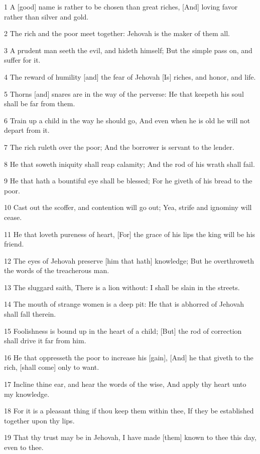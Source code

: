 \par 1 A [good] name is rather to be chosen than great riches, [And] loving favor rather than silver and gold.
\par 2 The rich and the poor meet together: Jehovah is the maker of them all.
\par 3 A prudent man seeth the evil, and hideth himself; But the simple pass on, and suffer for it.
\par 4 The reward of humility [and] the fear of Jehovah [Is] riches, and honor, and life.
\par 5 Thorns [and] snares are in the way of the perverse: He that keepeth his soul shall be far from them.
\par 6 Train up a child in the way he should go, And even when he is old he will not depart from it.
\par 7 The rich ruleth over the poor; And the borrower is servant to the lender.
\par 8 He that soweth iniquity shall reap calamity; And the rod of his wrath shall fail.
\par 9 He that hath a bountiful eye shall be blessed; For he giveth of his bread to the poor.
\par 10 Cast out the scoffer, and contention will go out; Yea, strife and ignominy will cease.
\par 11 He that loveth pureness of heart, [For] the grace of his lips the king will be his friend.
\par 12 The eyes of Jehovah preserve [him that hath] knowledge; But he overthroweth the words of the treacherous man.
\par 13 The sluggard saith, There is a lion without: I shall be slain in the streets.
\par 14 The mouth of strange women is a deep pit: He that is abhorred of Jehovah shall fall therein.
\par 15 Foolishness is bound up in the heart of a child; [But] the rod of correction shall drive it far from him.
\par 16 He that oppresseth the poor to increase his [gain], [And] he that giveth to the rich, [shall come] only to want.
\par 17 Incline thine ear, and hear the words of the wise, And apply thy heart unto my knowledge.
\par 18 For it is a pleasant thing if thou keep them within thee, If they be established together upon thy lips.
\par 19 That thy trust may be in Jehovah, I have made [them] known to thee this day, even to thee.
